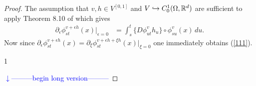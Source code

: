\documentclass[noinfoline]{imsart}
\def\Ver{1}
\def\LongVer{1}
\begin{document}
\begin{proof} The assumption that $v,h \in V^{[0,1]}$ and $V\hookrightarrow C_0^1(\Omega,\Bbb R^d)$ are sufficient to apply
Theorem 8.10 of \cite{you:10} which gives
\begin{align*}
{\partial_\epsilon}  \phi^{ v+\epsilon h}_{st}(x) \bigr|_{\epsilon = 0} &= \int_s^t  \bigl\{D\phi^{ v}_{ut} h_u \bigr\}\circ{\phi^{ v}_{su}(x)}\,   du. 
 \end{align*}
 Now since ${\partial_\epsilon}  \phi^{ v+\epsilon h}_{st}(x) = {\partial_\xi}  \phi^{ v+\epsilon h+\xi h}_{st}(x)\bigr|_{\xi = 0} $ one immediately obtains (\ref{111}). 
 
\if\Ver\LongVer{ 
{\flushleft\textcolor{blue}{$\downarrow$---------begin long version---------}}\newline

}
\end{proof}
\end{document}
